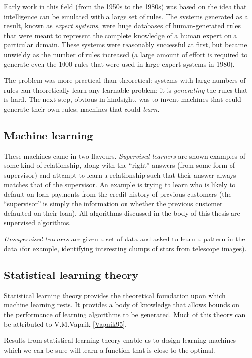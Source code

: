 Early work in this field (from the 1950s to the 1980s) was based on
the idea that intelligence can be emulated with a large set of rules.
The systems generated as a result, known as \emph{expert systems},
were huge databases of human-generated rules that were meant to
represent the complete knowledge of a human expert on a particular
domain.  These systems were reasonably successful at first, but became
unwieldy as the number of rules increased (a large amount of effort is
required to generate even the 1000 rules that were used in large
expert systems in 1980). 

The problem was more practical than theoretical: systems with large
numbers of rules can theoretically learn any learnable problem; it is
\emph{generating} the rules that is hard.  The next step, obvious in
hindsight, was to invent machines that could generate their own
rules; machines that could \emph{learn}.


\subsection{Machine learning}

These machines came in two flavours.  \emph{Supervised learners} are
shown examples of some kind of relationship, along with the ``right''
answers (from some form of supervisor) and attempt to learn a
relationship such that their answer always matches that of the
supervisor.  An example is trying to learn who is likely to default on
loan payments from the credit history of previous customers (the
``supervisor'' is simply the information on whether the previous
customer defaulted on their loan).  All algorithms discussed in the
body of this thesis are supervised algorithms.

\emph{Unsupervised learners} are given a set of data and asked to
learn a pattern in the data (for example, identifying interesting
clumps of stars from telescope images).


\subsection{Statistical learning theory}

Statistical learning theory provides the theoretical foundation upon
which machine learning rests.  It provides a body of knowledge that
allows bounds on the performance of learning algorithms to be
generated.  Much of this theory can be attributed to V.M.Vapnik
\ref{Vapnik95}.

Results from statistical learning theory enable us to design learning
machines which we can be sure will learn a function that is close to
the optimal.


